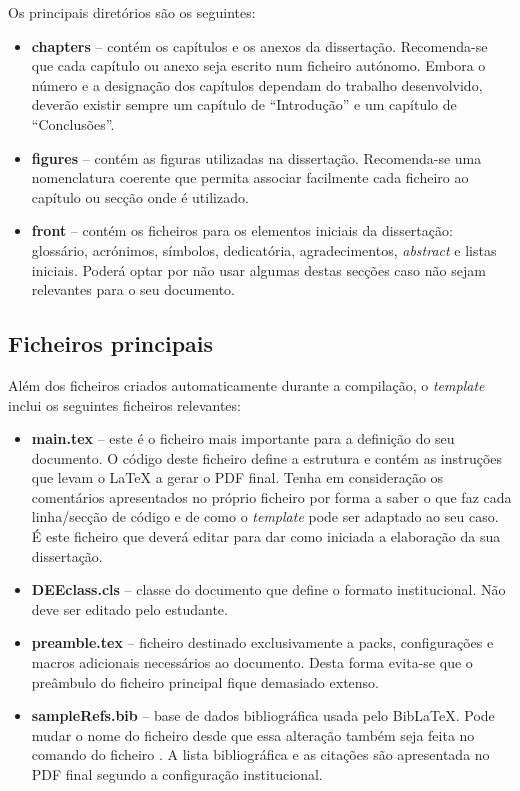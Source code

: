 Os principais diretórios são os seguintes:

\begin{itemize}
     \item \textbf{chapters} -- contém os capítulos e os anexos da dissertação. Recomenda-se que cada capítulo ou anexo seja escrito num ficheiro  autónomo. Embora o número e a designação dos capítulos dependam do trabalho desenvolvido, deverão existir sempre um capítulo de ``Introdução'' e um capítulo de ``Conclusões''.

     \item \textbf{figures} -- contém as figuras utilizadas na dissertação. Recomenda-se uma nomenclatura coerente que permita associar facilmente cada ficheiro ao capítulo ou secção onde é utilizado.

     \item \textbf{front} -- contém os ficheiros para os elementos iniciais da dissertação: glossário, acrónimos, símbolos, dedicatória, agradecimentos, \textit{abstract} e listas iniciais. Poderá optar por não usar algumas destas secções caso não sejam relevantes para o seu documento.
\end{itemize}

\subsection{Ficheiros principais}

Além dos ficheiros criados automaticamente durante a compilação, o \textit{template} inclui os seguintes ficheiros relevantes:

\begin{itemize}
\item \textbf{main.tex} -- este é o ficheiro mais importante para a definição do seu documento. O código deste ficheiro define a estrutura e contém as instruções que levam o \LaTeX{} a gerar o PDF final. Tenha em consideração os comentários apresentados no próprio ficheiro por forma a saber o que faz cada linha/secção de código e de como o \textit{template} pode ser adaptado ao seu caso. É este ficheiro que deverá editar para dar como iniciada a elaboração da sua dissertação.

\item \textbf{DEEclass.cls} -- classe do documento que define o formato institucional. Não deve ser editado pelo estudante.

\item \textbf{preamble.tex} -- ficheiro destinado exclusivamente a \glspl{pack}, configurações e macros adicionais necessários ao documento. Desta forma evita-se que o preâmbulo do ficheiro principal  fique demasiado extenso. 

\item \textbf{sampleRefs.bib} -- base de dados bibliográfica usada pelo Bib\LaTeX{}. Pode mudar o nome do ficheiro desde que essa alteração também seja feita no comando \verb|| do ficheiro . A lista bibliográfica e as citações são apresentada no PDF final segundo a configuração institucional.

\end{itemize}

